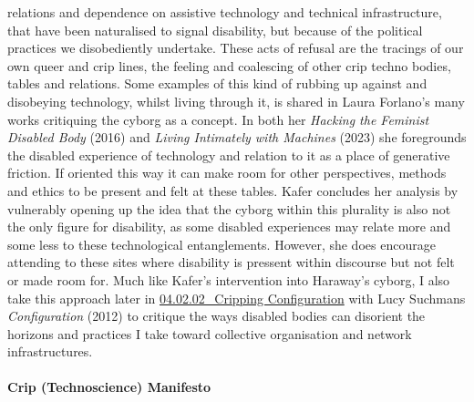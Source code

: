 relations and dependence on assistive technology and technical
infrastructure, that have been naturalised to signal disability, but
because of the political practices we disobediently undertake. These
acts of refusal are the tracings of our own queer and crip lines, the
feeling and coalescing of other crip techno bodies, tables and
relations. Some examples of this kind of rubbing up against and
disobeying technology, whilst living through it, is shared in Laura
Forlano's many works critiquing the cyborg as a concept. In both her
\emph{Hacking the Feminist Disabled Body} (2016) and \emph{Living
Intimately with Machines} (2023) she foregrounds the disabled experience
of technology and relation to it as a place of generative friction. If
oriented this way it can make room for other perspectives, methods and
ethics to be present and felt at these tables. Kafer concludes her
analysis by vulnerably opening up the idea that the cyborg within this
plurality is also not the only figure for disability, as some disabled
experiences may relate more and some less to these technological
entanglements. However, she does encourage attending to these sites
where disability is pressent within discourse but not felt or made room
for. Much like Kafer's intervention into Haraway's cyborg, I also take
this approach later in
\href{../../04_Configure-able_Methods/sections/04.02.02_Cripping\%20Configuration.md}{04.02.02\_Cripping
Configuration} with Lucy Suchmans \emph{Configuration} (2012) to
critique the ways disabled bodies can disorient the horizons and
practices I take toward collective organisation and network
infrastructures.

\hypertarget{crip-technoscience-manifesto}{%
\paragraph[Crip (Technoscience)
Manifesto]{\texorpdfstring{\protect\hypertarget{anchor}{}{}Crip
(Technoscience)
Manifesto}{Crip (Technoscience) Manifesto}}\label{crip-technoscience-manifesto}}

